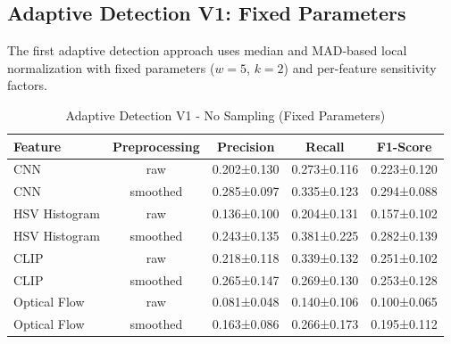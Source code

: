 \documentclass[11pt,a4paper]{article}
\begin{document}

\subsection{Adaptive Detection V1: Fixed Parameters}

The first adaptive detection approach uses median and MAD-based local normalization with fixed parameters ($w=5$, $k=2$) and per-feature sensitivity factors.

\begin{table}[H]
\centering
\caption{Adaptive Detection V1 - No Sampling (Fixed Parameters)}
\label{tab:adaptive_v1_no_sampling}
\small
\begin{tabular}{lcccc}
\toprule
\textbf{Feature} & \textbf{Preprocessing} & \textbf{Precision} & \textbf{Recall} & \textbf{F1-Score} \\
\midrule
CNN & raw & 0.202±0.130 & 0.273±0.116 & 0.223±0.120 \\
CNN & smoothed & 0.285±0.097 & 0.335±0.123 & 0.294±0.088 \\
\midrule
HSV Histogram & raw & 0.136±0.100 & 0.204±0.131 & 0.157±0.102 \\
HSV Histogram & smoothed & 0.243±0.135 & 0.381±0.225 & 0.282±0.139 \\
\midrule
CLIP & raw & 0.218±0.118 & 0.339±0.132 & 0.251±0.102 \\
CLIP & smoothed & 0.265±0.147 & 0.269±0.130 & 0.253±0.128 \\
\midrule
Optical Flow & raw & 0.081±0.048 & 0.140±0.106 & 0.100±0.065 \\
Optical Flow & smoothed & 0.163±0.086 & 0.266±0.173 & 0.195±0.112 \\
\bottomrule
\end{tabular}
\end{table}
\end{document}
